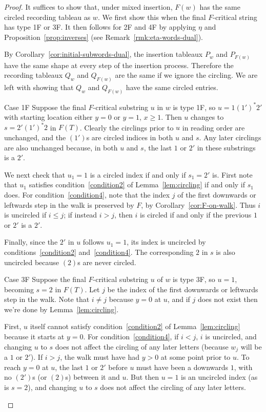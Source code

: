 \documentclass[10pt]{amsart}
\theoremstyle{definition}
\begin{document}
\begin{proof}
It suffices to show that, under mixed insertion, $F(w)$ has the same circled recording tableau as $w$. We first show this when the final $F$-critical string has type 1F or 3F. It then follows for 2F and 4F by applying $\eta$ and Proposition~\ref{prop:inverses} (see Remark~\ref{rmk:eta-words-dual}).

By Corollary~\ref{cor:initial-subwords-dual}, the insertion tableaux $P_{w}$ and $P_{F(w)}$ have the same shape at every step of the insertion process. Therefore the recording tableaux $Q_{w}$ and $Q_{F(w)}$ are the same if we ignore the circling. We are left with showing that $Q_{w}$ and $Q_{F(w)}$ have the same circled entries.


\begin{enonce*}[remark]{Case 1F} Suppose the final $F$-critical substring $u$ in $w$ is type 1F, so $u=1(1')^\ast 2'$ with starting location either $y=0$ or $y=1$, $x\ge 1$. Then $u$ changes to $s=2'(1')^\ast 2$ in $F(T)$. Clearly the circlings prior to $u$ in reading order are unchanged, and the $(1')$s are circled indices in both $u$ and $s$. Any later circlings are also unchanged because, in both $u$ and $s$, the last $1$ or $2'$ in these substrings is a $2'$.

We next check that $u_1=1$ is a circled index if and only if $s_1=2'$ is. First note that $u_1$ satisfies condition~\ref{condition2} of Lemma~\ref{lem:circling} if and only if $s_1$ does. For condition~\ref{condition4}, note that the index $j$ of the first downwards or leftwards step in the walk is preserved by $F$, by Corollary~\ref{cor:F-on-walk}. Thus $i$ is uncircled if $i \leq j$; if instead $i > j$, then $i$ is circled if and only if the previous $1$ or $2'$ is a $2'$.

Finally, since the $2'$ in $u$ follows $u_1=1$, its index is uncircled by conditions~\ref{condition2} and~\ref{condition4}. The corresponding $2$ in $s$ is also uncircled because $(2)$s are never circled.
\end{enonce*}

\begin{enonce*}[remark]{Case 3F} Suppose the final $F$-critical substring $u$ of $w$ is type 3F, so $u=1$, becoming $s=2$ in $F(T)$. Let $j$ be the index of the first downwards or leftwards step in the walk. Note that $i \ne j$ because $y=0$ at $u$, and if $j$ does not exist then we're done by Lemma~\ref{lem:circling}.

First, $u$ itself cannot satisfy condition~\ref{condition2} of Lemma~\ref{lem:circling} because it starts at $y=0$. For condition~\ref{condition4}, if $i < j$, $i$ is uncircled, and changing $u$ to $s$ does not affect the circling of any later letters (because $w_j$ will be a $1$ or $2'$). If $i > j$, the walk must have had $y>0$ at some point prior to $u$. To reach $y=0$ at $u$, the last $1$ or $2'$ before $u$ must have been a downwards $1$, with no $(2')$s (or $(2)$s) between it and $u$. But then $u=1$ is an uncircled index (as is $s=2$), and changing $u$ to $s$ does not affect the circling of any later letters.\qedhere
\end{enonce*}
\end{proof}
\end{document}
